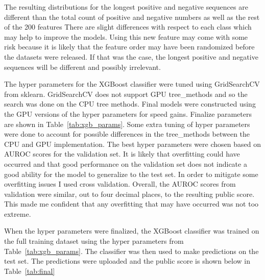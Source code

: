 \documentclass[11pt,letterpaper]{article}
\begin{document}
The resulting distributions for the longest positive and negative sequences are
different than the total count of positive and negative numbers as well as the
rest of the 200 features There are slight differences with respect to each class
which may help to improve the models.  Using this new feature may come with some
risk because it is likely that the feature order may have been randomized before
the datasets were released.  If that was the case, the longest positive and
negative sequences will be different and possibly irrelevant.

The hyper parameters for the XGBoost classifier were tuned using GridSearchCV
from sklearn.  GridSearchCV does not support GPU tree\_methods and so the search
was done on the CPU tree methods.  Final models were constructed using the GPU
versions of the hyper parameters for speed gains.  Finalize parameters are shown
in Table~\ref{tab:xgb_params}.  Some extra tuning of hyper parameters were done
to account for possible differences in the tree\_methods between the CPU and GPU
implementation.  The best hyper parameters were chosen based on AUROC scores
for the validation set.  It is likely that overfitting could have occurred and
that good performance on the validation set does not indicate a good ability for
the model to generalize to the test set.  In order to mitigate some overfitting
issues I used cross validation.  Overall, the AUROC scores from validation were
similar, out to four decimal places, to the resulting public score.  This made
me confident that any overfitting that may have occurred was not too extreme.

\begin{table}[h!]
\centering
\caption{XGBoost final hyper parameters}
\label{tab:xgb_params}
\end{table}

When the hyper parameters were finalized, the XGBoost classifier was trained on
the full training dataset using the hyper parameters from
Table~\ref{tab:xgb_params}.  The classifier was then used to make predictions on
the test set.  The predictions were uploaded and the public score is shown below
in Table~\ref{tab:final}
\end{document}
